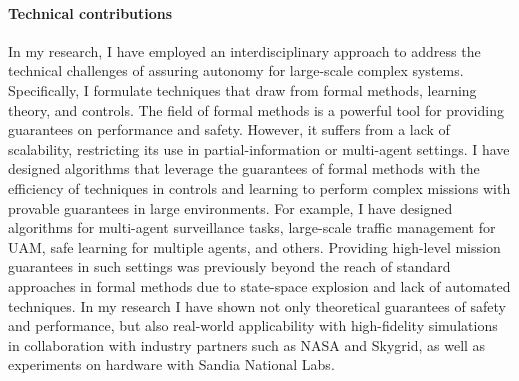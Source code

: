 \paragraph{Technical contributions} In my research, I have employed an interdisciplinary approach to address the technical challenges of assuring autonomy for large-scale complex systems. Specifically, I formulate techniques that draw from formal methods, learning theory, and controls. The field of formal methods is a powerful tool for providing guarantees on performance and safety. However, it suffers from a lack of scalability, restricting its use in partial-information or multi-agent settings. I have designed algorithms that leverage the guarantees of formal methods with the efficiency of techniques in controls and learning to perform complex missions with provable guarantees in large environments. For example, I have designed algorithms for multi-agent surveillance tasks, large-scale traffic management for UAM, safe learning for multiple agents, and others. Providing high-level mission guarantees in such settings was previously beyond the reach of standard approaches in formal methods due to state-space explosion and lack of automated techniques. In my research I have shown not only theoretical guarantees of safety and performance, but also real-world applicability with high-fidelity simulations in collaboration with industry partners such as NASA and Skygrid, as well as experiments on hardware with Sandia National Labs.
